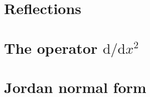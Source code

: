 \documentclass[letter-paper]{tufte-book}
\begin{document}

\section{Reflections}


\section{The operator $\mathrm{d}/\mathrm{d}x^2$}


\section{Jordan normal form}








\mainmatter




%


\end{document}
